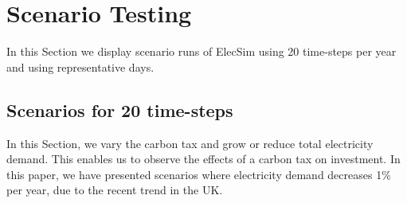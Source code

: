 



\clearpage
\section{Scenario Testing}
\label{elecsim:sec:scenarios}

In this Section we display scenario runs of ElecSim using 20 time-steps per year and using representative days.

\subsection{Scenarios for 20 time-steps}

In this Section, we vary the carbon tax and grow or reduce total electricity demand. This enables us to observe the effects of a carbon tax on investment. In this paper, we have presented scenarios where electricity demand decreases 1\% per year, due to the recent trend in the UK.





